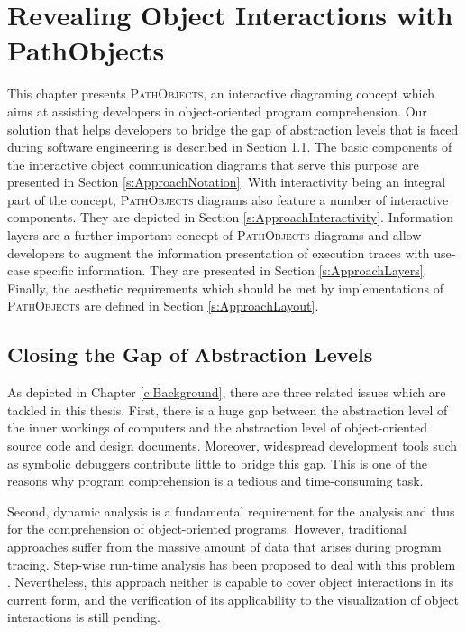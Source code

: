 \chapter{Revealing Object Interactions with PathObjects}
\label{c:approach}
This chapter presents \textsc{PathObjects}, an interactive diagraming concept which aims at assisting developers in object-oriented program comprehension.
Our solution that helps developers to bridge the gap of abstraction levels that is faced during software engineering is described in Section \ref{s:ApproachConcept}.
The basic components of the interactive object communication diagrams that serve this purpose are presented in Section \ref{s:ApproachNotation}.
With interactivity being an integral part of the concept, \textsc{PathObjects} diagrams also feature a number of interactive components.
They are depicted in Section \ref{s:ApproachInteractivity}.
Information layers are a further important concept of \textsc{PathObjects} diagrams and allow developers to augment the information presentation of execution traces with use-case specific information.
They are presented in Section \ref{s:ApproachLayers}.
Finally, the aesthetic requirements which should be met by implementations of \textsc{PathObjects} are defined in Section \ref{s:ApproachLayout}.

\section{Closing the Gap of Abstraction Levels}
\label{s:ApproachConcept}
As depicted in Chapter \ref{c:Background}, there are three related issues which are tackled in this thesis.
First, there is a huge gap between the abstraction level of the inner workings of computers and the abstraction level of object-oriented source code and design documents.
Moreover, widespread development tools such as symbolic debuggers contribute little to bridge this gap.
This is one of the reasons why program comprehension is a tedious and time-consuming task.

Second, dynamic analysis is a fundamental requirement for the analysis and thus for the comprehension of object-oriented programs.
However, traditional approaches suffer from the massive amount of data that arises during program tracing.
Step-wise run-time analysis has been proposed to deal with this problem \cite{perscheid_immediacy_2010}.
Nevertheless, this approach neither is capable to cover object interactions in its current form, and the verification of its applicability to the visualization of object interactions is still pending.

